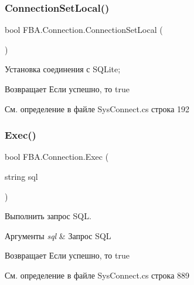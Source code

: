 \subsubsection{\texorpdfstring{Connection\+Set\+Local()}{ConnectionSetLocal()}}
{\footnotesize\ttfamily bool F\+B\+A.\+Connection.\+Connection\+Set\+Local (\begin{DoxyParamCaption}{ }\end{DoxyParamCaption})}



Установка соединения с S\+Q\+Lite; 

\begin{DoxyReturn}{Возвращает}
Если успешно, то true
\end{DoxyReturn}


См. определение в файле Sys\+Connect.\+cs строка 192

\mbox{\label{class_f_b_a_1_1_connection_aad46a834def484b00f7930ca4ec880be}} 
\subsubsection{\texorpdfstring{Exec()}{Exec()}\hspace{0.1cm}{\footnotesize\ttfamily [1/2]}}
{\footnotesize\ttfamily bool F\+B\+A.\+Connection.\+Exec (\begin{DoxyParamCaption}\item[{string}]{sql }\end{DoxyParamCaption})}



Выполнить запрос S\+QL. 


\begin{DoxyParams}{Аргументы}
{\em sql} & Запрос S\+QL\\
\hline
\end{DoxyParams}
\begin{DoxyReturn}{Возвращает}
Если успешно, то true
\end{DoxyReturn}


См. определение в файле Sys\+Connect.\+cs строка 889

\mbox{\label{class_f_b_a_1_1_connection_aa58e35746bf7d3176e982770ae60c83e}} 

